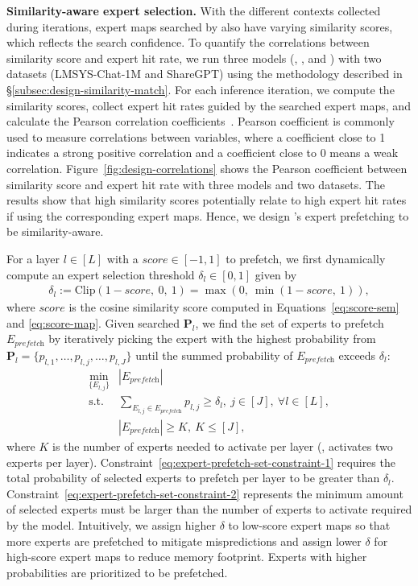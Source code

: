 \textbf{Similarity-aware expert selection.}
With the different contexts collected during iterations, expert maps searched by \sys also have varying similarity scores, which reflects the search confidence. 
%
To quantify the correlations between similarity score and expert hit rate, we run three \MoE models (\mixtral, \qwen, and \phimoe) with two datasets (LMSYS-Chat-1M and ShareGPT) using the methodology described in \S\ref{subsec:design-similarity-match}. 
For each inference iteration, we compute the similarity scores, collect expert hit rates guided by the searched expert maps, and calculate the Pearson correlation coefficients~\cite{cohen2009pearson}.
Pearson coefficient is commonly used to measure correlations between variables, where a coefficient close to 1 indicates a strong positive correlation and a coefficient close to 0 means a weak correlation.
%
Figure~\ref{fig:design-correlations} shows the Pearson coefficient between similarity score and expert hit rate with three \MoE models and two datasets.
%
The results show that high similarity scores potentially relate to high expert hit rates if using the corresponding expert maps.
Hence, we design \sys's expert prefetching to be similarity-aware. 


For a layer $l \in [L]$ with a $\textit{score} \in [-1, 1]$ to prefetch, we first dynamically compute an expert selection threshold $\delta_l \in [0, 1]$ given by
\begin{align*}
    \delta_l := \textrm{Clip}(1-\textit{score},~0,~1) = \max(0,~\min(1-\textit{score},~1)),
\end{align*}
where $\textit{score}$ is the cosine similarity score computed in Equations~\ref{eq:score-sem} and \ref{eq:score-map}. 
% 
Given searched $\mathbf{P}_l$, we find the set of experts to prefetch $E_{\textit{prefetch}}$ by iteratively picking the expert with the highest probability from $\mathbf{P}_l = \{p_{l,1}, \ldots, p_{l,j}, \ldots, p_{l,J}\}$ until the summed probability of $E_{\textit{prefetch}}$ exceeds $\delta_l$:
\begin{align}
    \min_{\{E_{l,j}\}} &|E_{\textit{prefetch}}| \label{eq:expert-prefetch-set} \\
    \mathrm{s.t.} 
    &\sum_{E_{l,j} \in E_{\textit{prefetch}}} p_{l,j} \geq \delta_l, ~j \in [J], ~\forall l \in [L], \label{eq:expert-prefetch-set-constraint-1} \\
    &|E_{\textit{prefetch}}| \geq K, ~K \leq [J], \label{eq:expert-prefetch-set-constraint-2}
\end{align}
% 
where $K$ is the number of experts needed to activate per layer (\eg, \mixtral activates two experts per layer). 
% 
Constraint~\ref{eq:expert-prefetch-set-constraint-1} requires the total probability of selected experts to prefetch per layer to be greater than $\delta_l$.
Constraint~\ref{eq:expert-prefetch-set-constraint-2} represents the minimum amount of selected experts must be larger than the number of experts to activate required by the \MoE model. 
% 
Intuitively, we assign higher $\delta$ to low-score expert maps so that more experts are prefetched to mitigate mispredictions and assign lower $\delta$ for high-score expert maps to reduce memory footprint. 
%
Experts with higher probabilities are prioritized to be prefetched.

